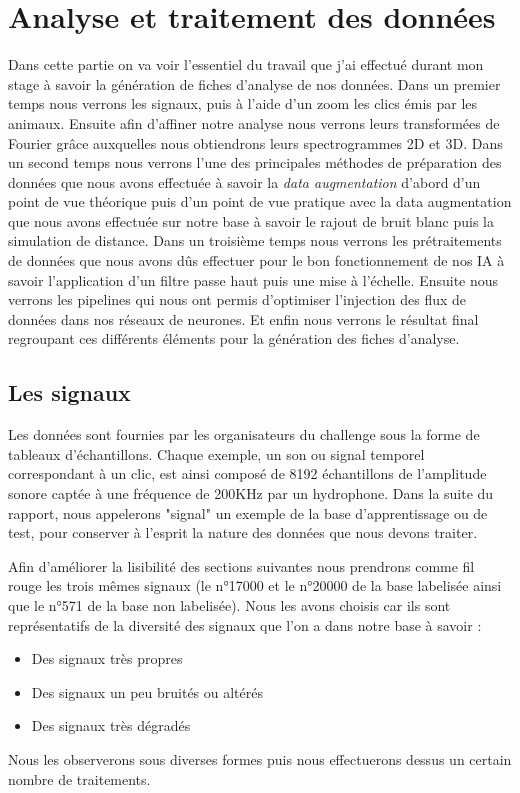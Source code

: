
\hypertarget{Analyse-et-traitement-des-donnuxe9es}{%
\chapter{Analyse et traitement des données}\label{Analyse-et-traitement-des-donnuxe9es}}

Dans cette partie on va voir l'essentiel du travail que j'ai effectué durant mon stage à savoir la génération de fiches d'analyse de nos données. Dans un premier temps nous verrons les signaux, puis à l'aide d'un zoom les clics émis par les animaux. Ensuite afin d'affiner notre analyse nous verrons leurs transformées de Fourier grâce auxquelles nous obtiendrons leurs spectrogrammes 2D et 3D. Dans un second temps nous verrons l'une des principales méthodes de préparation des données que nous avons effectuée à savoir la \textit{data augmentation} d'abord d'un point de vue théorique puis d'un point de vue pratique avec la data augmentation que nous avons effectuée sur notre base à savoir le rajout de bruit blanc puis la simulation de distance. Dans un troisième temps nous verrons les prétraitements de données que nous avons dûs effectuer pour le bon fonctionnement de nos IA à savoir l'application d'un filtre passe haut puis une mise à l'échelle. Ensuite nous verrons les pipelines qui nous ont permis d'optimiser l'injection des flux de données dans nos réseaux de neurones. Et enfin nous verrons le résultat final regroupant ces différents éléments pour la génération des fiches d'analyse.

\hypertarget{Les-signaux}{%
\section{Les signaux}
\label{Les-signaux}}
Les données sont fournies par les organisateurs du challenge sous la forme de tableaux d'échantillons. Chaque exemple, un son ou signal temporel correspondant à un clic, est ainsi composé de 
8192 échantillons de l'amplitude sonore captée à une fréquence de 200KHz par un hydrophone. 
Dans la suite du rapport, nous appelerons "signal" un exemple de la base d'apprentissage ou de test, pour conserver à l'esprit la nature des données que nous devons traiter.

Afin d'améliorer la lisibilité des sections suivantes nous prendrons comme fil rouge les trois mêmes signaux (le n°17000 et le n°20000 de la base labelisée ainsi que le n°571 de la base non labelisée).
Nous les avons choisis car ils sont représentatifs de la diversité des signaux que l'on a dans notre base à savoir :
\begin{itemize}
\item Des signaux très propres
\item Des signaux un peu bruités ou altérés
\item Des signaux très dégradés
\end{itemize}
Nous les observerons sous diverses formes puis nous effectuerons dessus un certain nombre de traitements.

